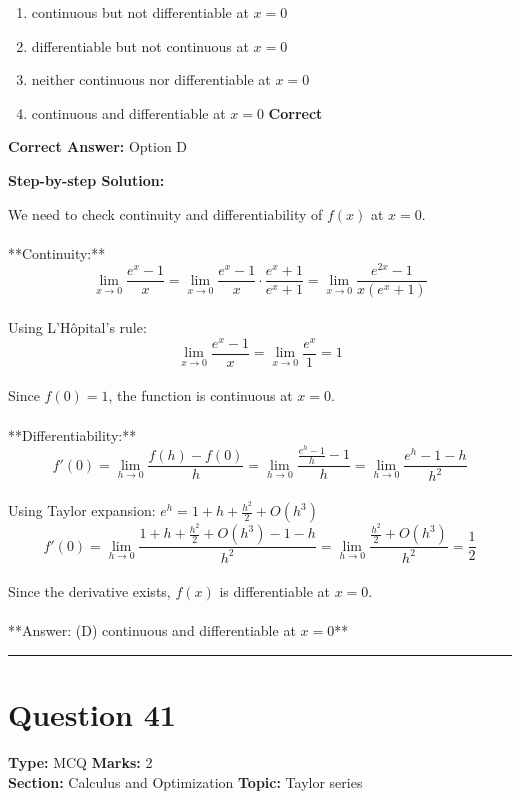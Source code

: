 \documentclass[11pt]{article}
\begin{document}
\begin{enumerate}[label=\textbf{\Alph*.}, leftmargin=1.8em]
\item continuous but not differentiable at \(x = 0\)\item differentiable but not continuous at \(x = 0\)\item neither continuous nor differentiable at \(x = 0\)\item continuous and differentiable at \(x = 0\) \hfill {\color{gategreen}\textbf{Correct}}\end{enumerate}

\textbf{Correct Answer:} Option D

\textbf{Step-by-step Solution:}

We need to check continuity and differentiability of \(f(x)\) at \(x = 0\).\\
\\
**Continuity:**\\
\[\lim_{x \to 0} \frac{e^x - 1}{x} = \lim_{x \to 0} \frac{e^x - 1}{x} \cdot \frac{e^x + 1}{e^x + 1} = \lim_{x \to 0} \frac{e^{2x} - 1}{x(e^x + 1)}\]\\
Using L'Hôpital's rule:\\
\[\lim_{x \to 0} \frac{e^x - 1}{x} = \lim_{x \to 0} \frac{e^x}{1} = 1\]\\
Since \(f(0) = 1\), the function is continuous at \(x = 0\).\\
\\
**Differentiability:**\\
\[f'(0) = \lim_{h \to 0} \frac{f(h) - f(0)}{h} = \lim_{h \to 0} \frac{\frac{e^h - 1}{h} - 1}{h} = \lim_{h \to 0} \frac{e^h - 1 - h}{h^2}\]\\
Using Taylor expansion: \(e^h = 1 + h + \frac{h^2}{2} + O(h^3)\)\\
\[f'(0) = \lim_{h \to 0} \frac{1 + h + \frac{h^2}{2} + O(h^3) - 1 - h}{h^2} = \lim_{h \to 0} \frac{\frac{h^2}{2} + O(h^3)}{h^2} = \frac{1}{2}\]\\
Since the derivative exists, \(f(x)\) is differentiable at \(x = 0\).\\
\\
**Answer: (D) continuous and differentiable at \(x = 0\)**

\vspace{0.8em}
\hrule
\vspace{0.4em}
\section*{Question 41}
\textbf{Type:} MCQ \hfill \textbf{Marks:} 2\\
\textbf{Section:} Calculus and Optimization \hfill \textbf{Topic:} Taylor series
\end{document}
